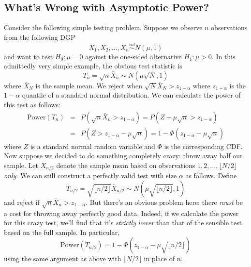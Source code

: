 \documentclass[12pt]{article}
\theoremstyle{definition}
\begin{document}
\subsection{What's Wrong with Asymptotic Power?}
Consider the following simple testing problem. Suppose we observe $n$ observations from the following DGP
$$X_1, X_2, \hdots, X_{n} \overset{iid}{\sim}N(\mu, 1)$$
and want to test $H_0\colon \mu = 0$ against the one-sided alternative $H_1\colon \mu >0$. 
In this admittedly very simple example, the obvious test statistic is
$$T_{n} = \sqrt{n} \bar{X}_{n} \sim N\left(\mu \sqrt{N}, 1\right)$$
where $\bar{X}_{N}$ is the sample mean. We reject when $\sqrt{N} \bar{X}_{N}>z_{1-\alpha}$ where $z_{1-\alpha}$ is the $1-\alpha$ quantile of a standard normal distribution. 
We can calculate the power of this test as follows:
\begin{eqnarray*}
\mbox{Power}(T_{n}) &=& P\left(\sqrt{n} \bar{X}_{n}>z_{1-\alpha}\right) = P\left(Z + \mu\sqrt{n} >z_{1-\alpha}\right)\\
&=&P\left(Z >z_{1-\alpha} - \mu\sqrt{n}\right) = 1 - \Phi\left(z_{1-\alpha} - \mu\sqrt{n}\right)
\end{eqnarray*}
where $Z$ is a standard normal random variable and $\Phi$ is the corresponding CDF. 
Now suppose we decided to do something completely crazy: throw away half our sample. Let $\bar{X}_{n/2}$ denote the sample mean based on observations $1, 2, \hdots, \lfloor N/2 \rfloor $ \emph{only}. 
We can still construct a perfectly valid test with size $\alpha$ as follows. 
Define
$$T_{n/2} = \sqrt{\lfloor n/2 \rfloor } \bar{X}_{n/2} \sim N\left(\mu \sqrt{\lfloor n/2 \rfloor }, 1\right)$$
and reject if $\sqrt{n} \bar{X}_n > z_{1-\alpha}$.
But there's an obvious problem here: there \emph{must} be a cost for throwing away perfectly good data. 
Indeed, if we calculate the power for this crazy test, we'll find that it's \emph{strictly lower} than that of the sensible test based on the full sample. 
In particular,
$$\mbox{Power}(T_{n/2}) = 1 - \Phi\left(z_{1-\alpha} - \mu\sqrt{\lfloor n/2 \rfloor }\right)$$
using the same argument as above with $\lfloor N/2 \rfloor $ in place of $n$.
\end{document}
